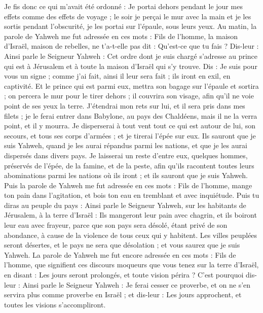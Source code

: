 \begin{multicols}{2}
Je fis donc ce qui m'avait été ordonné : Je portai dehors pendant le jour mes effets comme des effets de voyage ; le soir je perçai le mur avec la main et je les sortis pendant l’obscurité, je les portai sur l'épaule, sous leurs yeux.
Au matin, la parole de Yahweh me fut adressée en ces mots :
Fils de l’homme, la maison d'Israël, maison de rebelles, ne t'a-t-elle pas dit : Qu'est-ce que tu fais ?
Dis-leur : Ainsi parle le Seigneur Yahweh : Cet ordre dont je suis chargé s'adresse au prince qui est à Jérusalem et à  toute la maison d'Israël qui s’y trouve.
Dis : Je suis pour vous un signe ; comme j'ai fait, ainsi il leur sera fait ; ils iront en exil, en captivité.
Et le prince qui est parmi eux, mettra son bagage sur l'épaule et sortira ; on percera le mur pour le tirer dehors ; il couvrira son visage, afin qu'il ne voie point de ses yeux la terre.
J'étendrai mon rets sur lui, et il sera pris dans mes filets ; je le ferai entrer dans Babylone, au pays des Chaldéens, mais il ne la verra point, et il y mourra.
Je disperserai à tout vent tout ce qui est autour de lui, son secours, et tous ses corps d’armées ; et je tirerai l'épée sur eux.
Ils sauront que je suis Yahweh, quand je les aurai répandus parmi les nations, et que je les aurai dispersés dans divers pays.
Je laisserai un reste d'entre eux, quelques hommes, préservés de l'épée, de la famine, et de la peste, afin qu'ils racontent toutes leurs abominations parmi les nations où ils iront ; et ils sauront que je suis Yahweh.
Puis la parole de Yahweh me fut adressée en ces mots :
Fils de l’homme, mange ton pain dans l'agitation, et bois ton eau en tremblant et avec inquiétude.
Puis tu diras au peuple du pays : Ainsi parle le Seigneur Yahweh, sur les habitants de Jérusalem, à la terre d'Israël : Ils mangeront leur pain avec chagrin, et ils boiront leur eau avec frayeur, parce que son pays sera désolé, étant privé de son abondance, à cause de la violence de tous ceux qui y habitent.
Les villes peuplées seront désertes, et le pays ne sera que désolation ; et vous saurez que je suis Yahweh.
La parole de Yahweh me fut encore adressée en ces mots :
Fils de l’homme, que signifient ces discours moqueurs que vous tenez sur la terre d'Israël, en disant : Les jours seront prolongés, et toute vision périra ?
C'est pourquoi dis-leur : Ainsi parle le Seigneur Yahweh : Je ferai cesser ce proverbe, et on ne s'en servira plus comme proverbe en Israël ; et dis-leur : Les jours approchent, et toutes les visions s’accompliront.

\end{multicols}

